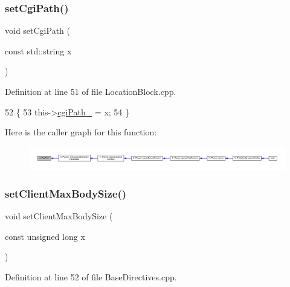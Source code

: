 \subsubsection{\texorpdfstring{set\+Cgi\+Path()}{setCgiPath()}}
{\footnotesize\ttfamily void set\+Cgi\+Path (\begin{DoxyParamCaption}\item[{const std\+::string}]{x }\end{DoxyParamCaption})}



Definition at line 51 of file Location\+Block.\+cpp.


\begin{DoxyCode}
52     \{
53         this->\hyperlink{classft_1_1_location_block_a88189428cc92093d70626539b8851f5f}{cgiPath\_} = x;
54     \}
\end{DoxyCode}
Here is the caller graph for this function\+:
\nopagebreak
\begin{figure}[H]
\begin{center}
\leavevmode
\includegraphics[width=350pt]{classft_1_1_location_block_a25189c8c38f0b9ec831bb1b5295669c3_icgraph}
\end{center}
\end{figure}
\mbox{\label{classft_1_1_base_directives_a39bf4922f3236043c76beaffaa557a3b}} 
\subsubsection{\texorpdfstring{set\+Client\+Max\+Body\+Size()}{setClientMaxBodySize()}}
{\footnotesize\ttfamily void set\+Client\+Max\+Body\+Size (\begin{DoxyParamCaption}\item[{const unsigned long}]{x }\end{DoxyParamCaption})\hspace{0.3cm}{\ttfamily [inherited]}}



Definition at line 52 of file Base\+Directives.\+cpp.


